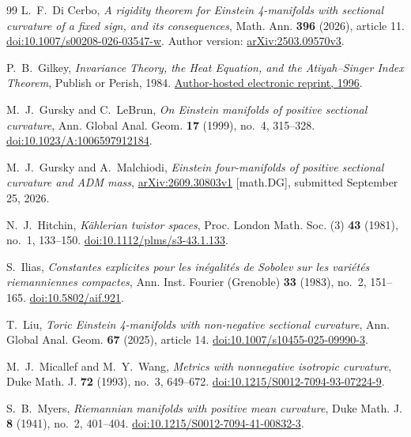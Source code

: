 \begin{thebibliography}{99}
L.~F.~Di Cerbo, \emph{A rigidity theorem for Einstein 4-manifolds with sectional curvature of a fixed sign, and its consequences}, Math. Ann. \textbf{396} (2026), article 11.
\href{https://doi.org/10.1007/s00208-026-03547-w}{doi:10.1007/s00208-026-03547-w}.
Author version: \href{https://arxiv.org/abs/2503.09570v3}{arXiv:2503.09570v3}.

P.~B.~Gilkey, \emph{Invariance Theory, the Heat Equation, and the Atiyah--Singer Index Theorem}, Publish or Perish, 1984. \href{https://pages.uoregon.edu/gilkey/dirPDF/InvarianceTheory1Ed.pdf}{Author-hosted electronic reprint, 1996}.

M.~J.~Gursky and C.~LeBrun, \emph{On Einstein manifolds of positive sectional curvature}, Ann. Global Anal. Geom. \textbf{17} (1999), no.~4, 315--328.
\href{https://doi.org/10.1023/A:1006597912184}{doi:10.1023/A:1006597912184}.

M.~J.~Gursky and A.~Malchiodi,
\emph{Einstein four-manifolds of positive sectional curvature and ADM mass},
\href{https://arxiv.org/abs/2609.30803v1}{arXiv:2609.30803v1} [math.DG], submitted September 25, 2026.

N.~J.~Hitchin, \emph{K\"ahlerian twistor spaces},
Proc. London Math. Soc. (3) \textbf{43} (1981), no.~1, 133--150.
\href{https://doi.org/10.1112/plms/s3-43.1.133}{doi:10.1112/plms/s3-43.1.133}.

S.~Ilias, \emph{Constantes explicites pour les in\'egalit\'es de Sobolev sur les vari\'et\'es riemanniennes compactes}, Ann. Inst. Fourier (Grenoble) \textbf{33} (1983), no.~2, 151--165.
\href{https://doi.org/10.5802/aif.921}{doi:10.5802/aif.921}.

T.~Liu, \emph{Toric Einstein 4-manifolds with non-negative sectional curvature},
Ann. Global Anal. Geom. \textbf{67} (2025), article 14.
\href{https://doi.org/10.1007/s10455-025-09990-3}{doi:10.1007/s10455-025-09990-3}.

M.~J.~Micallef and M.~Y.~Wang,
\emph{Metrics with nonnegative isotropic curvature},
Duke Math. J. \textbf{72} (1993), no.~3, 649--672.
\href{https://doi.org/10.1215/S0012-7094-93-07224-9}{doi:10.1215/S0012-7094-93-07224-9}.

S.~B.~Myers, \emph{Riemannian manifolds with positive mean curvature}, Duke Math. J. \textbf{8} (1941), no.~2, 401--404.
\href{https://doi.org/10.1215/S0012-7094-41-00832-3}{doi:10.1215/S0012-7094-41-00832-3}.


\end{thebibliography}
